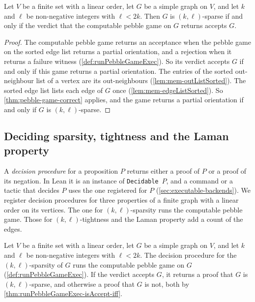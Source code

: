 \begin{theorem}
  \label{thm:runPebbleGameExec-isAccept-iff}
  \leanok
  Let $V$ be a finite set with a linear order, let $G$ be a simple graph
  on $V$, and let $k$ and $\ell$ be non-negative integers with
  $\ell < 2k$. Then $G$ is $(k, \ell)$-sparse if and only if the verdict
  that the computable pebble game on $G$ returns accepts $G$.
\end{theorem}
\begin{proof}
  \leanok
  The computable pebble game returns an acceptance when the pebble game
  on the sorted edge list returns a partial orientation, and a
  rejection when it returns a failure witness
  (\cref{def:runPebbleGameExec}). So its verdict accepts $G$ if and only
  if this game returns a partial orientation. The entries of the sorted
  out-neighbour list of a vertex are its out-neighbours
  (\cref{lem:mem-outListSorted}). The sorted edge list lists each edge
  of $G$ once (\cref{lem:mem-edgeListSorted}). So
  \cref{thm:pebble-game-correct} applies, and the game returns a partial
  orientation if and only if $G$ is $(k, \ell)$-sparse.
\end{proof}

\subsection{Deciding sparsity, tightness and the Laman property}
\label{sec:executable-decidable}

A \emph{decision procedure} for a proposition $P$ returns either a
proof of $P$ or a proof of its negation. In Lean it is an instance of
\texttt{Decidable}~$P$, and a command or a tactic that decides $P$ uses
the one registered for $P$ (\cref{sec:executable-backends}). We
register decision procedures for three properties of a finite graph
with a linear order on its vertices. The one for $(k, \ell)$-sparsity
runs the computable pebble game. Those for $(k, \ell)$-tightness and
the Laman property add a count of the edges.

\begin{definition}
  \label{def:isSparse-decidable}
  \leanok
  Let $V$ be a finite set with a linear order, let $G$ be a simple graph
  on $V$, and let $k$ and $\ell$ be non-negative integers with
  $\ell < 2k$. The decision procedure for the $(k, \ell)$-sparsity of
  $G$ runs the computable pebble game on $G$
  (\cref{def:runPebbleGameExec}). If the verdict accepts $G$, it returns
  a proof that $G$ is $(k, \ell)$-sparse, and otherwise a proof that $G$
  is not, both by \cref{thm:runPebbleGameExec-isAccept-iff}.
\end{definition}

